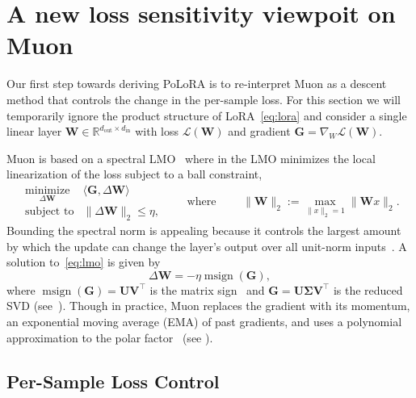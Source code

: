 \documentclass[11pt]{article}
\newcommand{\mat}[1]{\bm{#1}}
\newcommand{\cL}{\mathcal{L}}
\newcommand{\R}{\mathbb{R}}
\newcommand{\ip}[1]{\langle #1 \rangle}
\DeclareMathOperator{\msign}{msign}          %
\newcommand{\norm}[1]{\| #1\|}
\newcommand{\methodname}{PoLoRA\xspace}
\begin{document}
\section{A new loss sensitivity viewpoit on Muon}\label{sec:muon}
Our first step towards deriving  \methodname{} is to re-interpret Muon as a descent method that controls the change in the per-sample loss. 
For this section we will temporarily ignore the product structure of LoRA~\eqref{eq:lora} and consider a single linear layer $\mat{W} \in \R^{d_{\mathrm{out}} \times d_{\mathrm{in}}}$ with loss $\cL(\mat{W})$ and gradient $\mat{G} = \nabla_W \mathcal{L}(\mat{W})$.


Muon is based on a spectral LMO~\cite{bernstein2025modular,pmlr-v38-carlson15,carlson2015preconditioned} where in the LMO minimizes the local linearization of the loss subject to a ball constraint,
\begin{equation}
 \begin{array}{ll}
  \underset{\Delta\mat{W}}{\mathrm{minimize}} &
  \ip{\mat{G}, \Delta\mat{W}} \\[2pt]
  \mbox{subject to} &
  \displaystyle
  \norm{\Delta\mat{W}}_2
  \le \eta,
  \end{array}
  \qquad \mbox{where }\qquad 
\|\mat{W}\|_2 := \max_{\|x\|_2 =1} \|\mat{W} x \|_2.
  \label{eq:lmo}
\end{equation}
Bounding the spectral norm is appealing because it controls the largest amount by which the update can change the layer's output over all unit-norm inputs~\cite{yang2023spectral}.
A solution to~\eqref{eq:lmo} is given by 
\[
    \Delta\mat{W} = -\eta \msign(\mat{G}),
\]
where $\msign(\mat{G})=\mat{U}\mat{V}^\top$ is the matrix sign~\cite{bernstein2025modular}
and $\mat{G}=\mat{U}\mat{\Sigma} \mat{V}^\top$ is the reduced SVD (see~). Though 
in practice, Muon replaces the gradient with its momentum, an exponential
moving average (EMA) of past gradients, and uses a polynomial approximation
to the polar factor~\cite{polarexpress,gram_ns} (see ). 



\subsection{Per-Sample Loss Control}\label{sec:sample-loss-lmo}
\end{document}
